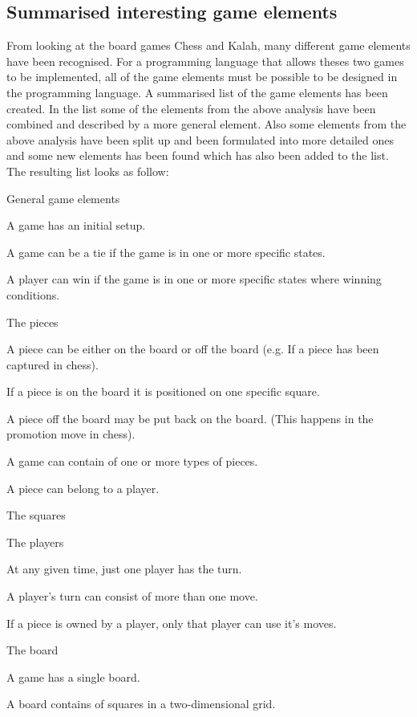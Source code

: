 \subsection{Summarised interesting game elements}
\label{subsec:differences}
From looking at the board games Chess and Kalah, many different game elements have been recognised. For a programming language that allows theses two games to be implemented, all of the game elements must be possible to be designed in the programming language. A summarised list of the game elements has been created. In the list some of the elements from the above analysis have been combined and described by a more general element. Also some elements from the above analysis have been split up and been formulated into more detailed ones and some new elements has been found which has also been added to the list. The resulting list looks as follow:  

\begin{dlist}
  \item[General game elements]
  	\begin{dlist}
  		\item A game has an initial setup.
  		\item A game can be a tie if the game is in one or more specific states.
  		\item A player can win if the game is in one or more specific states where winning conditions. 
  	\end{dlist}
  \item[The pieces]
  	\begin{dlist}
  		\item A piece can be either on the board or off the board (e.g. If a piece has been captured in chess).
  			\begin{dlist}
  				\item If a piece is on the board it is positioned on one specific square.
  				\item A piece off the board may be put back on the board. (This happens in the promotion move in chess).
  			\end{dlist}
  		\item A game can contain of one or more types of pieces.
  		\item A piece can belong to a player.
  	\end{dlist}
  \item[The squares]
  \item[The players]
  	\begin{dlist}
  		\item At any given time, just one player has the turn.
  		\item A player's turn can consist of more than one move.
  		\item If a piece is owned by a player, only that player can use it's moves.
  	\end{dlist}
  \item[The board]
  	\begin{dlist}
  		\item A game has a single board.
  		\item A board contains of squares in a two-dimensional grid.
  	\end{dlist}
\end{dlist}

